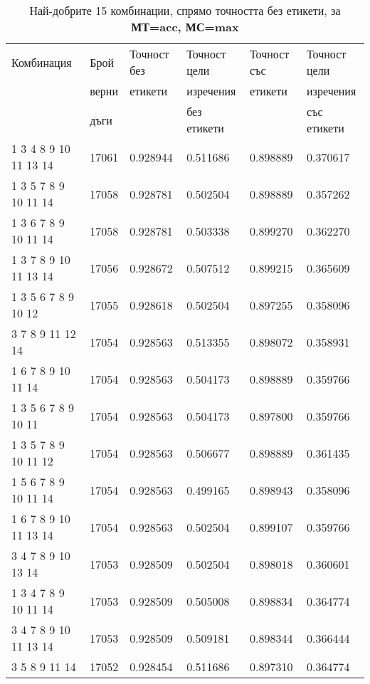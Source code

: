 \begin{table}[!htb] 
\caption{Най-добрите 15 комбинации, спрямо точността без етикети, за \textbf{МТ=acc, МС=max}}
  \begin{tabular}{|l|l|l|l|l|l|}
\hline 
Комбинация & Брой  & Точност без  & Точност цели  & Точност със  & Точност цели  \\
 & верни	& етикети & изречения & етикети & изречения \\
 & дъги	& 	& без етикети & 	& със етикети \\
\hline 
1 3 4 8 9 10 11 13 14 &	17061 &	0.928944 &	0.511686 &	0.898889 &	0.370617\\ 
\hline 
1 3 5 7 8 9 10 11 14 &	17058 &	0.928781 &	0.502504 &	0.898889 &	0.357262\\ 
\hline 
1 3 6 7 8 9 10 11 14 &	17058 &	0.928781 &	0.503338 &	0.899270 &	0.362270\\ 
\hline 
1 3 7 8 9 10 11 13 14 &	17056 &	0.928672 &	0.507512 &	0.899215 &	0.365609\\ 
\hline 
1 3 5 6 7 8 9 10 12 &	17055 &	0.928618 &	0.502504 &	0.897255 &	0.358096\\ 
\hline 
3 7 8 9 11 12 14 &	17054 &	0.928563 &	0.513355 &	0.898072 &	0.358931\\ 
\hline 
1 6 7 8 9 10 11 14 &	17054 &	0.928563 &	0.504173 &	0.898889 &	0.359766\\ 
\hline 
1 3 5 6 7 8 9 10 11 &	17054 &	0.928563 &	0.504173 &	0.897800 &	0.359766\\ 
\hline 
1 3 5 7 8 9 10 11 12 &	17054 &	0.928563 &	0.506677 &	0.898889 &	0.361435\\ 
\hline 
1 5 6 7 8 9 10 11 14 &	17054 &	0.928563 &	0.499165 &	0.898943 &	0.358096\\ 
\hline 
1 6 7 8 9 10 11 13 14 &	17054 &	0.928563 &	0.502504 &	0.899107 &	0.359766\\ 
\hline 
3 4 7 8 9 10 13 14 &	17053 &	0.928509 &	0.502504 &	0.898018 &	0.360601\\ 
\hline 
1 3 4 7 8 9 10 11 14 &	17053 &	0.928509 &	0.505008 &	0.898834 &	0.364774\\ 
\hline 
3 4 7 8 9 10 11 13 14 &	17053 &	0.928509 &	0.509181 &	0.898344 &	0.366444\\ 
\hline 
3 5 8 9 11 14 &	17052 &	0.928454 &	0.511686 &	0.897310 &	0.364774\\ 
\hline 
 \end{tabular}
 \label{tab:lab_max_acc}
 \end{table}
